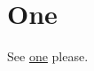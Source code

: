 \documentclass{article}
\begin{document}
\section{One}\label{one}
See \hyperref{section one}{Section }{ above}{one} please.
\end{document}
